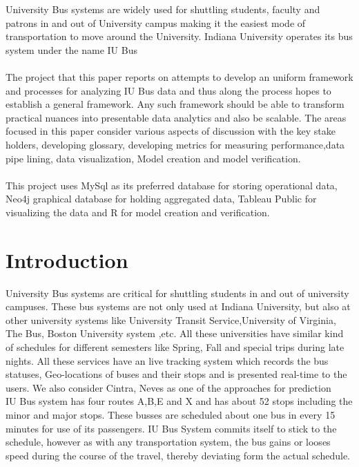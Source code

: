 \documentclass[12pt]{article}\usepackage[]{graphicx}\usepackage[]{color}
\renewenvironment{abstract}
 {\small
  \begin{center}
  \bfseries \abstractname\vspace{-.5em}\vspace{0pt}
  \end{center}
  \list{}{
    \setlength{\leftmargin}{.5cm}%
    \setlength{\rightmargin}{\leftmargin}%
  }%
  \item\relax}
 {\endlist}
\begin{document}
\begin{abstract}
University Bus systems are widely used for shuttling students, faculty and patrons in and out of University campus making it the easiest mode of transportation to move around the University. Indiana University operates its bus system under the name IU Bus\cite{1} \\ \\
The project that this paper reports on attempts to develop an uniform framework and processes for analyzing IU Bus data and thus along the process hopes to establish a general framework. Any such framework should be able to transform practical nuances into presentable data analytics and also be scalable. The areas focused in this paper consider various aspects of discussion with the key stake holders, developing glossary, developing metrics for measuring performance,data pipe lining, data visualization, Model creation and model verification.\\ \\
This project uses MySql as its preferred database for storing operational data, Neo4j graphical database for holding aggregated data, Tableau Public for visualizing the data and R for model creation and verification.
\end{abstract}

\clearpage

\tableofcontents
\clearpage

\section{Introduction}
University Bus systems are critical for shuttling students in and out of university campuses. These bus systems are not only used at Indiana University, but also at other university systems like University Transit Service,University of Virginia\cite{2}, The Bus, Boston University system \cite{3} ,etc. All these universities have similar kind of schedules for different semesters like Spring, Fall and special trips during late nights. All these services have an live tracking system which records the bus statuses, Geo-locations of buses and their stops and is presented real-time to the users. We also consider Cintra, Neves\cite{4} as one of the approaches for prediction\\

IU Bus system has four routes A,B,E and X and has about 52 stops including the minor and major stops. These busses are scheduled about one bus in every 15 minutes for use of its passengers. IU Bus System commits itself to stick to the schedule\cite{5}, however as with any transportation system, the bus gains or looses speed during the course of the travel, thereby deviating form the actual schedule. \\ \\
\end{document}
